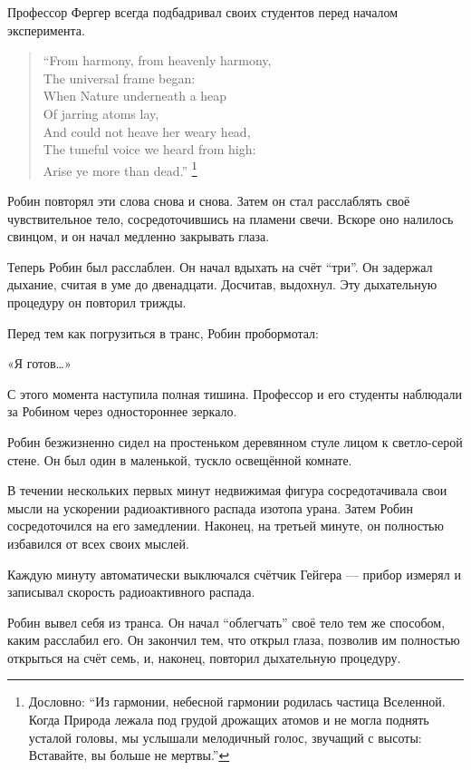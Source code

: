 \documentclass[a5paper, 9pt,
final, openany, twoside=true]{memoir}
\begin{document}
Профессор Фергер всегда подбадривал своих студентов перед началом эксперимента.
\begin{quote}
``From harmony, from heavenly harmony,\\
The universal frame began:\\
When Nature underneath a heap\\
Of jarring atoms lay,\\
And could not heave her weary head,\\
The tuneful voice we heard from high:\\
Arise ye more than dead.'' \footnote[1]{Дословно: ``Из гармонии, небесной гармонии родилась частица Вселенной. Когда Природа лежала под грудой дрожащих атомов и не могла поднять усталой головы, мы услышали мелодичный голос, звучащий с высоты: Вставайте, вы больше не мертвы.''}
\end{quote}

Робин повторял эти слова снова и снова. Затем он стал расслаблять своё чувствительное тело, сосредоточившись на пламени свечи. Вскоре оно налилось свинцом, и он начал медленно закрывать глаза.

Теперь Робин был расслаблен.  Он начал вдыхать на счёт ``три''. Он задержал дыхание, считая в уме до двенадцати. Досчитав, выдохнул. Эту дыхательную процедуру он повторил трижды.

Перед тем как погрузиться в транс, Робин пробормотал:

«Я готов…»\bigskip

С этого момента наступила полная тишина. Профессор и его студенты наблюдали за Робином через одностороннее зеркало.\bigskip

Робин безжизненно сидел на простеньком деревянном стуле лицом к светло-серой стене. Он был один в маленькой, тускло освещённой комнате.

В течении нескольких первых минут недвижимая фигура сосредотачивала свои мысли на ускорении радиоактивного распада изотопа урана. Затем Робин сосредоточился на его замедлении. Наконец, на третьей минуте, он полностью избавился от всех своих мыслей.

Каждую минуту автоматически выключался счётчик Гейгера — прибор измерял и записывал скорость радиоактивного распада.\bigskip

Робин вывел себя из транса. Он начал ``облегчать'' своё тело тем же способом, каким расслабил его. Он закончил тем, что открыл глаза, позволив им полностью открыться на счёт семь, и, наконец, повторил дыхательную процедуру.
\end{document}

